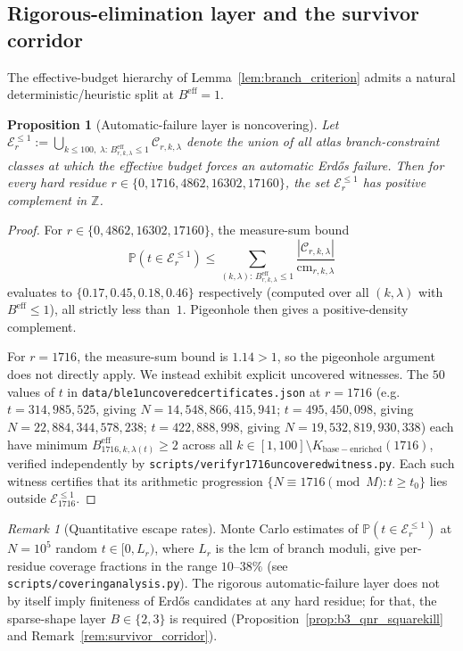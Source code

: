\documentclass[11pt]{article}
\renewcommand{\_}{\origunderscore\allowbreak}
\newtheorem{proposition}[theorem]{Proposition}
\theoremstyle{definition}
\theoremstyle{remark}
\newtheorem{remark}[theorem]{Remark}
\begin{document}
\subsection{Rigorous-elimination layer and the survivor corridor}\label{subsec:beff_covering}

The effective-budget hierarchy of Lemma~\ref{lem:branch_criterion}
admits a natural deterministic/heuristic split at $B^{\mathrm{eff}}=1$.

\begin{proposition}[Automatic-failure layer is noncovering]\label{prop:ble1_noncover}
Let $\mathcal E_{r}^{\le 1}
:=\bigcup_{k\le 100,\;\lambda:\,B^{\mathrm{eff}}_{r,k,\lambda}\le 1}
  \mathcal C_{r,k,\lambda}$
denote the union of all atlas branch-constraint classes at which the
effective budget forces an automatic Erd\H{o}s failure.  Then for
every hard residue $r\in\{0,1716,4862,16302,17160\}$, the set
$\mathcal E_{r}^{\le 1}$ has positive complement in $\mathbb Z$.
\end{proposition}
\begin{proof}
For $r\in\{0,4862,16302,17160\}$, the measure-sum bound
\[
  \mathbb P(t\in\mathcal E_{r}^{\le 1})
  \le
  \sum_{(k,\lambda):\,B^{\mathrm{eff}}_{r,k,\lambda}\le 1}
  \frac{|\mathcal C_{r,k,\lambda}|}{\mathrm{cm}_{r,k,\lambda}}
\]
evaluates to $\{0.17,0.45,0.18,0.46\}$ respectively (computed over all
$(k,\lambda)$ with $B^{\mathrm{eff}}\le 1$), all strictly less than~$1$.
Pigeonhole then gives a positive-density complement.

For $r=1716$, the measure-sum bound is $1.14>1$, so the pigeonhole
argument does not directly apply.  We instead exhibit explicit
uncovered witnesses.  The $50$ values of $t$ in
\texttt{data/b\_le1\_uncovered\_certificates.json} at $r=1716$ (e.g.\
$t=314{,}985{,}525$, giving $N=14{,}548{,}866{,}415{,}941$;
$t=495{,}450{,}098$, giving $N=22{,}884{,}344{,}578{,}238$;
$t=422{,}888{,}998$, giving $N=19{,}532{,}819{,}930{,}338$) each have
minimum $B^{\mathrm{eff}}_{1716,k,\lambda(t)}\ge 2$ across all
$k\in[1,100]\setminus K_{\mathrm{base-enriched}}(1716)$, verified
independently by \texttt{scripts/verify\_r1716\_uncovered\_witness.py}.
Each such witness certifies that its arithmetic progression
$\{N\equiv 1716\pmod M: t\ge t_0\}$ lies outside $\mathcal E_{1716}^{\le 1}$.
\end{proof}
\begin{remark}[Quantitative escape rates]\label{rem:ble1_mc}
Monte Carlo estimates of $\mathbb P(t\in\mathcal E_{r}^{\le 1})$ at
$N=10^5$ random $t\in[0,L_r)$, where $L_r$ is the lcm of branch moduli,
give per-residue coverage fractions in the range $10$--$38\%$ (see
\texttt{scripts/covering\_analysis.py}).  The rigorous automatic-failure
layer does not by itself imply finiteness of Erd\H{o}s candidates at any
hard residue; for that, the sparse-shape layer $B\in\{2,3\}$ is
required (Proposition~\ref{prop:b3_qnr_squarekill} and
Remark~\ref{rem:survivor_corridor}).
\end{remark}
\end{document}
